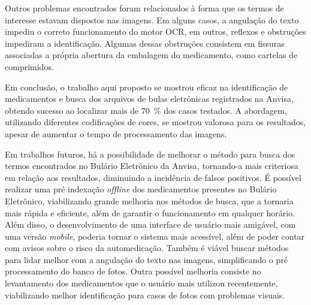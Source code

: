 Outros problemas encontrados foram relacionados à forma que os termos de interesse estavam dispostos nas imagens.
Em alguns casos, a angulação do texto impediu o correto funcionamento do motor \ac{OCR}, em outros, reflexos e obstruções impediram a identificação.
Algumas dessas obstruções consistem em fissuras associadas a própria abertura da embalagem do medicamento, como cartelas de comprimidos.

Em conclusão, o trabalho aqui proposto se mostrou eficaz na identificação de medicamentos e busca dos arquivos de bulas eletrônicas registrados na \ac{Anvisa}, obtendo sucesso ao localizar mais de \SI{70}{\percent} dos casos testados.
A abordagem, utilizando diferentes codificações de cores, se mostrou valorosa para os resultados, apesar de aumentar o tempo de processamento das imagens.

Em trabalhos futuros, há a possibilidade de melhorar o método para busca dos termos encontrados no Bulário Eletrônico da \ac{Anvisa}, tornando-a mais criteriosa em relação aos resultados, diminuindo a incidência de falsos positivos.
É possível realizar uma pré indexação \textit{offline} dos medicamentos presentes no Bulário Eletrônico, viabilizando grande melhoria nos métodos de busca, que a tornaria mais rápida e eficiente, além de garantir o funcionamento em qualquer horário.
Além disso, o desenvolvimento de uma interface de usuário mais amigável, com uma versão \textit{mobile}, poderia tornar o sistema mais acessível, além de poder contar com avisos sobre o risco da automedicação.
Também é viável buscar métodos para lidar melhor com a angulação do texto nas imagens, simplificando o pré processamento do banco de fotos.
Outra possível melhoria consiste no levantamento dos medicamentos que o usuário mais utilizou recentemente, viabilizando melhor identificação para casos de fotos com problemas visuais.

